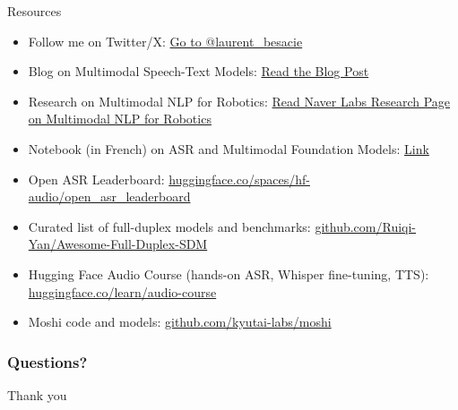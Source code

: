 \documentclass[table]{beamer}
\begin{document}
\begin{frame}{Resources}
\small
\begin{itemize}
    \item Follow me on Twitter/X: \href{https://x.com/laurent_besacie}{Go to @laurent\_besacie}
    \item Blog on Multimodal Speech-Text Models: \href{https://europe.naverlabs.com/blog/on-multimodal-speech-text-pre-trained-models/}{Read the Blog Post}
    \item Research on Multimodal NLP for Robotics: \href{https://europe.naverlabs.com/research/multimodal-nlp-for-robotics/}{Read Naver Labs Research Page on Multimodal NLP for Robotics}
    \item Notebook (in French) on ASR and Multimodal Foundation Models:  \href{https://colab.research.google.com/drive/13-qJfsHvVZNQ6SSBR3ULZw0HOqe05OwO?usp=sharing}{Link}
    \item Open ASR Leaderboard: \href{https://huggingface.co/spaces/hf-audio/open_asr_leaderboard}{huggingface.co/spaces/hf-audio/open\_asr\_leaderboard}
    \item Curated list of full-duplex models and benchmarks: \href{https://github.com/Ruiqi-Yan/Awesome-Full-Duplex-SDM}{github.com/Ruiqi-Yan/Awesome-Full-Duplex-SDM}
    \item Hugging Face Audio Course (hands-on ASR, Whisper fine-tuning, TTS): \href{https://huggingface.co/learn/audio-course}{huggingface.co/learn/audio-course}
    \item Moshi code and models: \href{https://github.com/kyutai-labs/moshi}{github.com/kyutai-labs/moshi}
\end{itemize}
\end{frame}

\begin{frame}
	\frametitle{Questions?}
	
	\vfill
	\centerline{\Huge Thank you}
	\vfill
\end{frame}







\end{document}
